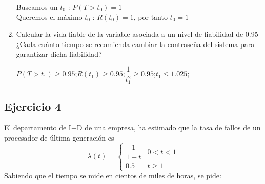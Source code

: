 \begin{enumerate}
\begin{tcolorbox}[colback=white,colframe=cyan!50!black,fonttitle=\bfseries]
    Buscamos un $t_0$ : $P(T>t_0)=1$\\
    Queremos el máximo $t_0$ : $R(t_0)=1$, por tanto $t_0 = 1$
    \end{tcolorbox}
    \item Calcular la vida fiable de la variable asociada a un nivel de fiabilidad de 0.95 ¿Cada cuánto tiempo se recomienda cambiar la contraseña del sistema para garantizar dicha fiabilidad?
    \begin{tcolorbox}[colback=white,colframe=cyan!50!black,fonttitle=\bfseries]
    $P(T>t_1)\geq0.95$;\quad$R(t_1)\geq0.95$;\quad$\dfrac{1}{t^2_1}\geq0.95$;\quad$t_1\leq 1.025$; 
    \end{tcolorbox}
\end{enumerate}

\subsection{Ejercicio 4}
El  departamento  de  I+D  de  una  empresa,  ha  estimado  que  la  tasa  de fallos  de  un  procesador  de  última generación es
\[ \lambda(t)=\begin{cases} 
      \dfrac{1}{1+t} & 0<t<1 \\
      0.5 & t\geq 1
   \end{cases}
\]
Sabiendo que el tiempo se mide en cientos de miles de horas, se pide:

